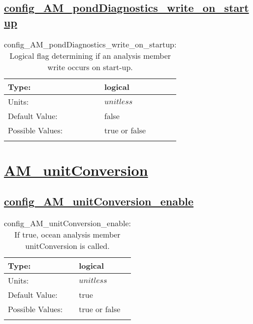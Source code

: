 \subsection[config\_AM\_pondDiagnostics\_write\_on\_startup]{\hyperref[sec:nm_tab_AM_pondDiagnostics]{config\_AM\_pondDiagnostics\_write\_on\_startup}}
\label{subsec:nm_sec_config_AM_pondDiagnostics_write_on_startup}
\begin{center}
\begin{longtable}{| p{2.0in} || p{4.0in} |}
    \hline
    Type: & logical \\
    \hline
    Units: & $unitless$ \\
    \hline
    Default Value: & false \\
    \hline
    Possible Values: & true or false \\
    \hline
    \caption{config\_AM\_pondDiagnostics\_write\_on\_startup: Logical flag determining if an analysis member write occurs on start-up.}
\end{longtable}
\end{center}
\section[AM\_unitConversion]{\hyperref[sec:nm_tab_AM_unitConversion]{AM\_unitConversion}}
\label{sec:nm_sec_AM_unitConversion}
\subsection[config\_AM\_unitConversion\_enable]{\hyperref[sec:nm_tab_AM_unitConversion]{config\_AM\_unitConversion\_enable}}
\label{subsec:nm_sec_config_AM_unitConversion_enable}
\begin{center}
\begin{longtable}{| p{2.0in} || p{4.0in} |}
    \hline
    Type: & logical \\
    \hline
    Units: & $unitless$ \\
    \hline
    Default Value: & true \\
    \hline
    Possible Values: & true or false \\
    \hline
    \caption{config\_AM\_unitConversion\_enable: If true, ocean analysis member unitConversion is called.}
\end{longtable}
\end{center}
